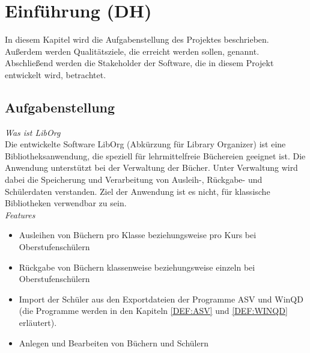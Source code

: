 \section{Einführung (DH)}
In diesem Kapitel wird die Aufgabenstellung des Projektes beschrieben. Außerdem werden Qualitätsziele, die erreicht werden sollen, genannt. Abschließend werden die Stakeholder der Software, die in diesem Projekt entwickelt wird, betrachtet.

\subsection{Aufgabenstellung}
\emph{Was ist LibOrg}\\
Die entwickelte Software LibOrg (Abkürzung für Library Organizer) ist eine Bibliotheksanwendung, die speziell für lehrmittelfreie Büchereien geeignet ist. Die Anwendung unterstützt bei der Verwaltung der Bücher. Unter Verwaltung wird dabei die Speicherung und Verarbeitung von Ausleih-, Rückgabe- und Schülerdaten verstanden. Ziel der Anwendung ist es nicht, für klassische Bibliotheken verwendbar zu sein.\bigskip \\
\emph{Features}
\begin{itemize}
	\item Ausleihen von Büchern pro Klasse beziehungsweise pro Kurs bei Oberstufenschülern
	\item Rückgabe von Büchern klassenweise beziehungsweise einzeln bei Oberstufenschülern
	\item Import der Schüler aus den Exportdateien der Programme ASV und WinQD (die Programme werden in den Kapiteln \ref{DEF:ASV} und \ref{DEF:WINQD} erläutert).
	\item Anlegen und Bearbeiten von Büchern und Schülern
\end{itemize}


